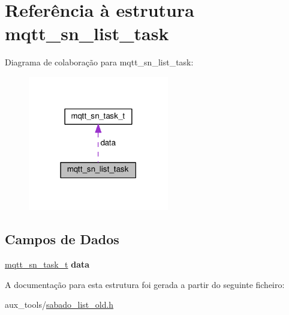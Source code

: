 \hypertarget{structmqtt__sn__list__task}{\section{Referência à estrutura mqtt\+\_\+sn\+\_\+list\+\_\+task}
\label{structmqtt__sn__list__task}
}


Diagrama de colaboração para mqtt\+\_\+sn\+\_\+list\+\_\+task\+:\nopagebreak
\begin{figure}[H]
\begin{center}
\leavevmode
\includegraphics[width=174pt]{structmqtt__sn__list__task__coll__graph}
\end{center}
\end{figure}
\subsection*{Campos de Dados}
\begin{DoxyCompactItemize}
\item 
\hypertarget{structmqtt__sn__list__task_a2a4aa9e422389a8d7a97309a99143ce2}{\hyperlink{structmqtt__sn__task__t}{mqtt\+\_\+sn\+\_\+task\+\_\+t} {\bfseries data}}\label{structmqtt__sn__list__task_a2a4aa9e422389a8d7a97309a99143ce2}

\end{DoxyCompactItemize}


A documentação para esta estrutura foi gerada a partir do seguinte ficheiro\+:\begin{DoxyCompactItemize}
\item 
aux\+\_\+tools/\hyperlink{sabado__list__old_8h}{sabado\+\_\+list\+\_\+old.\+h}\end{DoxyCompactItemize}
